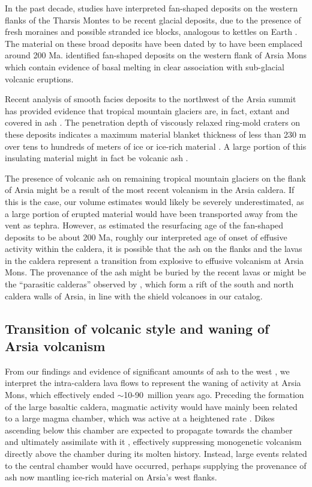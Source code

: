 \documentclass[12pt,letter]{article}
\begin{document}
In the past decade, studies have interpreted fan-shaped deposits on the western flanks of the Tharsis Montes to be recent glacial deposits, due to the presence of fresh moraines and possible stranded ice blocks, analogous to kettles on Earth \citep{shean2007recent,kadish2014middle,scanlon2015remnant}. The material on these broad deposits have been dated by \citet{kadish2014middle} to have been emplaced around 200 Ma. \citet{scanlon2015volcanism} identified fan-shaped deposits on the western flank of Arsia Mons which contain evidence of basal melting in clear association with sub-glacial volcanic eruptions. 

Recent analysis of smooth facies deposits to the northwest of the Arsia summit has provided evidence that tropical mountain glaciers are, in fact, extant and covered in ash \citep{scanlon2015remnant}. The penetration depth of viscously relaxed ring-mold craters on these deposits indicates a maximum material blanket thickness of less than 230 m over tens to hundreds of meters of ice or ice-rich material \citep{head2014preservation}. A large portion of this insulating material might in fact be volcanic ash \citep{wilson1994mars,mouginis2002prodigious}.

The presence of volcanic ash on remaining tropical mountain glaciers on the flank of Arsia might be a result of the most recent volcanism in the Arsia caldera. If this is the case, our volume estimates would likely be severely underestimated, as a large portion of erupted material would have been transported away from the vent as tephra. However, as \citet{kadish2014middle} estimated the resurfacing age of the fan-shaped deposits to be about 200 Ma, roughly our interpreted age of onset of effusive activity within the caldera, it is possible that the ash on the flanks and the lavas in the caldera represent a transition from explosive to effusive volcanism at Arsia Mons. The provenance of the ash might be buried by the recent lavas or might be the ``parasitic calderas'' observed by \citet{crumpler1996calderas}, which form a rift of the south and north caldera walls of Arsia, in line with the shield volcanoes in our catalog.

\subsection{Transition of volcanic style and waning of Arsia volcanism}
From our findings and evidence of significant amounts of ash to the west \citep{mouginis2002prodigious}, we interpret the intra-caldera lava flows to represent the waning of activity at Arsia Mons, which effectively ended $\sim$10-90~million years ago. Preceding the formation of the large basaltic caldera, magmatic activity would have mainly been related to a large magma chamber, which was active at a heightened rate \citep{wilson2001evidence}. Dikes ascending below this chamber are expected to propagate towards the chamber and ultimately assimilate with it \citep{karlstrom2009organization}, effectively suppressing monogenetic volcanism directly above the chamber during its molten history. Instead, large events related to the central chamber would have occurred, perhaps supplying the provenance of ash now mantling ice-rich material on Arsia's west flanks.
\end{document}
